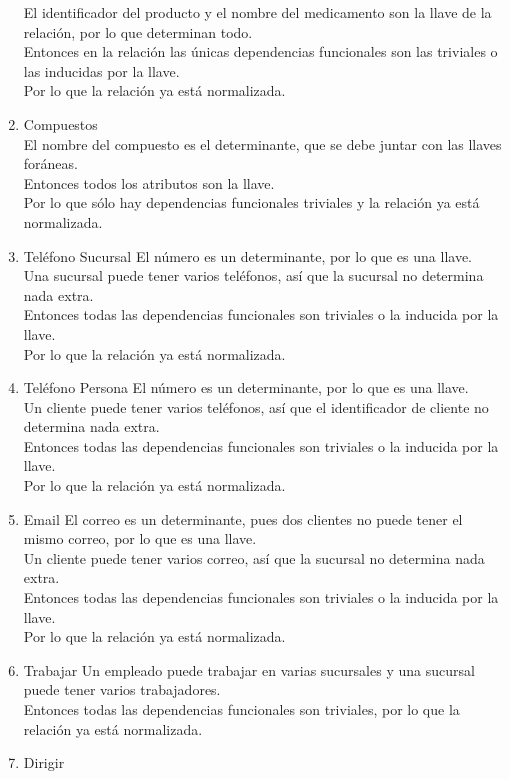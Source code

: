 \documentclass[10pt]{article}
\begin{document}
\begin{enumerate}
	El identificador del producto y el nombre del medicamento son la llave de la
	relación, por lo que determinan todo.\\
	Entonces en la relación las únicas dependencias funcionales son las
	triviales o las inducidas por la llave.\\
	Por lo que la relación ya está normalizada.
	\item Compuestos \\
	El nombre del compuesto es el determinante, que se debe juntar con las
	llaves foráneas.\\
	Entonces  todos los atributos son la llave.\\
	Por lo que sólo hay dependencias funcionales triviales y la relación ya está
	normalizada.
	\item Teléfono Sucursal
	El número es un determinante, por lo que es una llave.\\
	Una sucursal puede tener varios teléfonos, así que la sucursal no determina
	nada extra.\\
	Entonces todas las dependencias funcionales son triviales o la inducida por
	la llave.\\
	Por lo que la relación ya está normalizada.
	\item Teléfono Persona
	El número es un determinante, por lo que es una llave.\\
	Un cliente puede tener varios teléfonos, así que el identificador de cliente
	no determina nada extra.\\
	Entonces todas las dependencias funcionales son triviales o la inducida por
	la llave.\\
	Por lo que la relación ya está normalizada.
	\item Email
	El correo es un determinante, pues dos clientes no puede tener el mismo
	correo, por lo que es una llave.\\
	Un cliente puede tener varios correo, así que la sucursal no determina
	nada extra.\\
	Entonces todas las dependencias funcionales son triviales o la inducida por
	la llave.\\
	Por lo que la relación ya está normalizada.
	\item Trabajar
	Un empleado puede trabajar en varias sucursales y una sucursal puede tener
	varios trabajadores. \\
	Entonces todas las dependencias funcionales son triviales, por lo que la
	relación ya está normalizada.
	\item Dirigir \\

\end{enumerate}
\end{document}
